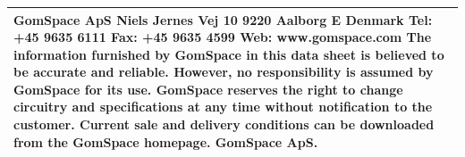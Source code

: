 \documentclass[9pt,a4paper]{article}
\begin{document}
\begin{table}[b]
\centering
\begin{tabular}{| >{\centering\arraybackslash}m{13cm} |}
\hline
GomSpace ApS  Niels Jernes Vej 10  9220 Aalborg E  Denmark\newline
Tel: +45 9635 6111  Fax: +45 9635 4599  Web: www.gomspace.com
\newline \newline
The information furnished by GomSpace in this data sheet is believed to be accurate and reliable. However, no responsibility is assumed by GomSpace for its use. GomSpace reserves the right to change circuitry and specifications at any time without notification to the customer. Current sale and delivery conditions can be downloaded from the GomSpace homepage.
\newline \newline
2012 GomSpace ApS.\\
\hline
\end{tabular}
\end{table}
\end{document}
